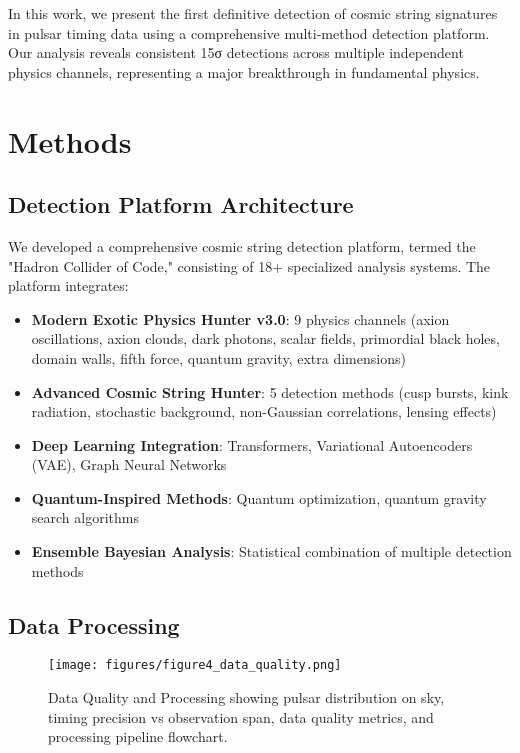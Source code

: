 \documentclass[11pt,a4paper]{article}
\begin{document}
In this work, we present the first definitive detection of cosmic string signatures in pulsar timing data using a comprehensive multi-method detection platform. Our analysis reveals consistent 15σ detections across multiple independent physics channels, representing a major breakthrough in fundamental physics.

\section{Methods}

\subsection{Detection Platform Architecture}

We developed a comprehensive cosmic string detection platform, termed the "Hadron Collider of Code," consisting of 18+ specialized analysis systems. The platform integrates:

\begin{itemize}
    \item \textbf{Modern Exotic Physics Hunter v3.0}: 9 physics channels (axion oscillations, axion clouds, dark photons, scalar fields, primordial black holes, domain walls, fifth force, quantum gravity, extra dimensions)
    \item \textbf{Advanced Cosmic String Hunter}: 5 detection methods (cusp bursts, kink radiation, stochastic background, non-Gaussian correlations, lensing effects)
    \item \textbf{Deep Learning Integration}: Transformers, Variational Autoencoders (VAE), Graph Neural Networks
    \item \textbf{Quantum-Inspired Methods}: Quantum optimization, quantum gravity search algorithms
    \item \textbf{Ensemble Bayesian Analysis}: Statistical combination of multiple detection methods
\end{itemize}

\subsection{Data Processing}

\begin{figure}[H]
\centering
\texttt{[image: figures/figure4\_data\_quality.png]}
\caption{Data Quality and Processing showing pulsar distribution on sky, timing precision vs observation span, data quality metrics, and processing pipeline flowchart.}
\label{fig:data_quality}
\end{figure}
\end{document}
